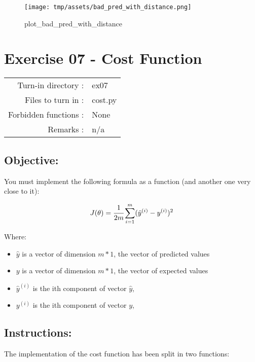 \documentclass[]{article}
\begin{document}
\begin{figure}
\centering
\texttt{[image: tmp/assets/bad\_pred\_with\_distance.png]}
\caption{plot\_bad\_pred\_with\_distance}
\end{figure}

\clearpage

\hypertarget{exercise-07---cost-function-1}{%
\section{Exercise 07 - Cost
Function}\label{exercise-07---cost-function-1}}

\begin{longtable}[]{@{}rl@{}}
\toprule
\endhead
Turn-in directory : & ex07\tabularnewline
Files to turn in : & cost.py\tabularnewline
Forbidden functions : & None\tabularnewline
Remarks : & n/a\tabularnewline
\bottomrule
\end{longtable}

\hypertarget{objective-4}{%
\subsection{Objective:}\label{objective-4}}

You must implement the following formula as a function (and another one
very close to it):

\large

\[
J(\theta) = \cfrac{1}{2m}\sum_{i=1}^{m}(\hat{y}^{(i)} - y^{(i)})^2
\] \normalsize

Where:

\begin{itemize}
\item
  \(\hat{y}\) is a vector of dimension \(m * 1\), the vector of
  predicted values
\item
  \(y\) is a vector of dimension \(m * 1\), the vector of expected
  values
\item
  \(\hat{y}^{(i)}\) is the ith component of vector \(\hat{y}\),
\item
  \(y^{(i)}\) is the ith component of vector \(y\),
\end{itemize}

\hypertarget{instructions-4}{%
\subsection{Instructions:}\label{instructions-4}}

The implementation of the cost function has been split in two functions:
\end{document}
